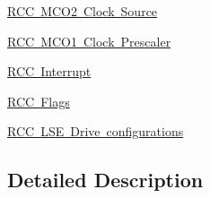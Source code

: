 \begin{DoxyCompactItemize}
\item 
\mbox{\hyperlink{group___r_c_c___m_c_o2___clock___source}{R\+C\+C M\+C\+O2 Clock Source}}
\item 
\mbox{\hyperlink{group___r_c_c___m_c_ox___clock___prescaler}{R\+C\+C M\+C\+O1 Clock Prescaler}}
\item 
\mbox{\hyperlink{group___r_c_c___interrupt}{R\+C\+C Interrupt}}
\item 
\mbox{\hyperlink{group___r_c_c___flag}{R\+C\+C Flags}}
\item 
\mbox{\hyperlink{group___r_c_c___l_s_e_drive___configuration}{R\+C\+C L\+S\+E Drive configurations}}
\end{DoxyCompactItemize}


\subsection{Detailed Description}
